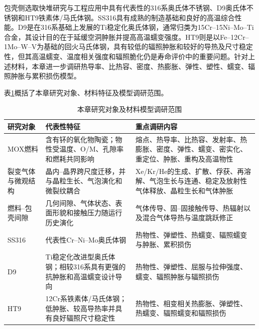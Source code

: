 包壳侧选取快堆研究与工程应用中具有代表性的316系奥氏体不锈钢、D9奥氏体不锈钢和HT9铁素体/马氏体钢。SS316具有成熟的制造基础和良好的高温综合性能。D9是在316系基础上发展的Ti稳定化奥氏体钢，通常归类为15Cr--15Ni--Mo--Ti合金，其设计目的在于延缓空洞肿胀并提高高温蠕变强度。HT9则是以Fe--12Cr--1Mo--W--V为基础的回火马氏体钢，具有较低的辐照肿胀和较好的导热及尺寸稳定性，但其高温蠕变、温度相关强度和辐照脆化仍是寿命评价中的重要问题\cite{garnerComparisonSwellingIrradiation2000,lathaThermalCreepProperties2008,leibowitzThermalConductivityThermal1988,chenIRRADIATIONEFFECTSHT92013}。针对上述材料，本章进一步调研热导率、比热容、密度、热膨胀、弹性、塑性、蠕变、辐照肿胀与累积损伤模型。

表\ref{tab:chapter2_model_scope}概括了本章研究对象、材料特征及模型调研范围。

\begin{table}[htbp]
	\centering
	\small
	\renewcommand{\arraystretch}{1.30}
	\caption{本章研究对象及材料模型调研范围}
	\label{tab:chapter2_model_scope}
	\begin{tabularx}{\textwidth}{
			>{\raggedright\arraybackslash}p{2.35cm}
			>{\raggedright\arraybackslash}p{3.15cm}
			>{\raggedright\arraybackslash}X}
		\toprule
		研究对象 & 代表性特征 & 重点调研内容 \\
		\midrule
		MOX燃料
		& 含有钚的氧化物陶瓷；物性受温度、O/M、孔隙率和燃耗共同影响
		& 熔点、热导率、比热容、发射率、热膨胀、密度、弹性、蠕变、密实化、重定位、肿胀、重构及高温物性 \\
		\addlinespace[0.5ex]
		裂变气体与微观结构
		& 晶内--晶界跨尺度迁移，并与晶粒生长、气泡演化和微裂纹耦合
		& Xe/Kr/He的生成、扩散、俘获、再溶解、气泡生长与连通、稳定及放射性气体释放、晶粒生长和气体肿胀 \\
		燃料--包壳间隙
		& 几何间隙、气体状态、表面形貌和接触压力随运行历史演化
		& 气体传导、固--固接触传导、热辐射以及混合气体导热与温度跳跃修正 \\
		SS316
		& 代表性Cr--Ni--Mo奥氏体钢
		& 热物性、弹塑性、热蠕变、辐照蠕变与肿胀、累积损伤 \\
		D9
		& Ti稳定化改进型奥氏体钢；相较316系具有更强的抗肿胀和高温蠕变设计导向
		& 热物性、弹塑性、屈服与拉伸强度、蠕变、辐照肿胀与辐照损伤 \\
		HT9
		& 12Cr系铁素体/马氏体钢；低肿胀、较高导热率并具有良好辐照尺寸稳定性
		& 热物性、相变相关热膨胀、弹塑性、热蠕变、辐照蠕变和辐照损伤 \\
		\bottomrule
	\end{tabularx}
\end{table}

